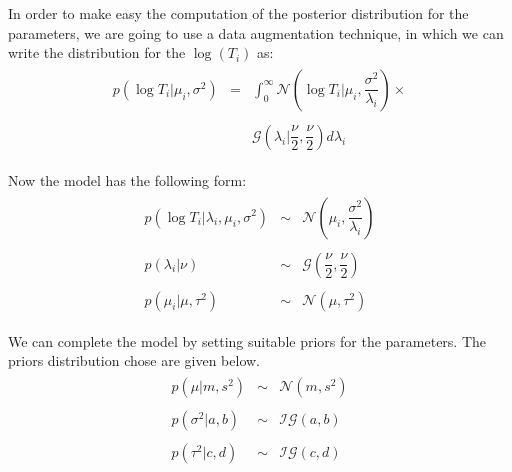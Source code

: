 \documentclass{asaproc}
\begin{document}
In order to make easy the computation of the posterior distribution for the parameters, we are going to use a data augmentation technique, in which we can write the distribution for the $\log(T_i)$ as:
\begin{eqnarray*}
\begin{array}{rrrr }
p(\log T_i |\mu_i,\sigma^2) & = & \displaystyle\int_0^\infty \mathcal{N}\left(\log T_i | \mu_i, \dfrac{\sigma^2}{\lambda_i} \right) \times \\\\
& & \mathcal{G}\left(\lambda_i| \dfrac{\nu}{2}, \dfrac{\nu}{2} \right)d\lambda_i 
\end{array}
\end{eqnarray*}

Now the model has the following form:
\begin{eqnarray*}
\begin{array}{rcl}
p(\log T_i |\lambda_i,\mu_i,\sigma^2) & \sim & \mathcal{N}\left( \mu_i,\dfrac{\sigma^2}{\lambda_i}\right) \\ \\

p(\lambda_i|\nu) & \sim & \mathcal{G}\left(\dfrac{\nu}{2},\dfrac{\nu}{2}\right) \\\\

p(\mu_i|\mu,\tau^2) &  \sim & \mathcal{N}\left( \mu,\tau^2\right)
\end{array}
\end{eqnarray*}

We can complete the model by setting suitable priors for the parameters. The priors distribution chose are given below.
\begin{eqnarray*}
\begin{array}{rcl}
p(\mu|m,s^2) & \sim & \mathcal{N}\left(m,s^2\right) \\ \\

p(\sigma^2|a,b) & \sim & \mathcal{IG}\left(a,b\right) \\\\

p(\tau^2|c,d) & \sim & \mathcal{IG}\left(c,d\right)
\end{array}
\end{eqnarray*}
\end{document}
